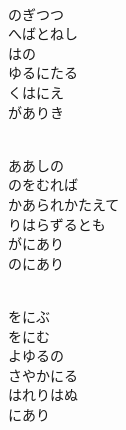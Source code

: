 \documentclass[10pt,b5j]{tarticle} %
\begin{document}
\vspace{1.5em} %
\newcommand{\linespace}{0.5em} %
\newcommand{\blocksize}{0.5\hsize} %
\newcommand{\itemmargin}{3em} %
\begin{enumerate} %
    \setlength{\itemindent}{\itemmargin} %
    \begin{minipage}[c]{\blocksize}
    
        \vspace{\linespace}
        \item~\\
        のぎつつ\\
        へばとねし\\
        はの\\
        ゆるにたる\\
        くはにえ\\
        がありき
        
    \end{minipage}
    \begin{minipage}[c]{\blocksize}
        
        \vspace{\linespace}
        \item~\\
        ああしの\\
        のをむれば\\
        かあられかたえて\\
        りはらずるとも\\
        がにあり\\
        のにあり
        
    \end{minipage}
    \begin{minipage}[c]{\blocksize}
        
        \vspace{\linespace}
        \item~\\
        をにぶ\\
        をにむ\\
        よゆるの\\
        さやかにる\\
        はれりはぬ\\
        にあり
        

\end{minipage}
\end{enumerate}
\end{document}

